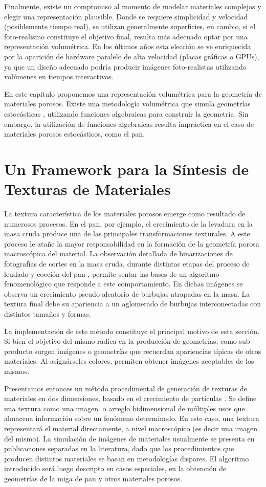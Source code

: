 Finalmente, existe un compromiso al momento de modelar materiales complejos y elegir una representación plausible.
Donde se requiere simplicidad y velocidad (posiblemente tiempo real), se utilizan generalmente superficies, en cambio, si el foto-realismo constituye el objetivo final, resulta más adecuado optar por una representación volumétrica.
En los últimos años esta elección se ve enriquecida por la aparición de hardware paralelo de alta velocidad (placas gráficas o GPUs), ya que un diseño adecuado podría producir imágenes foto-realistas utilizando volúmenes en tiempos interactivos.

En este capítulo proponemos una representación volumétrica para la geometría de materiales porosos.
Existe una metodología volumétrica que simula geometrías estocásticas \cite{Perlin1989}, utilizando funciones algebraicas para construir la geometría.
Sin embargo, la utilización de funciones algebraicas resulta impráctica en el caso de materiales porosos estocásticos, como el pan.

\section[Síntesis de Texturas de Materiales]{Un Framework para la Síntesis de Texturas de Materiales}

La textura característica de los materiales porosos emerge como resultado de numerosos procesos.
En el pan, por ejemplo, el crecimiento de la levadura en la masa cruda produce una de las principales transformaciones texturales.
A este proceso le atañe la mayor responsabilidad en la formación de la geometría porosa macroscópica del material.
La observación detallada de binarizaciones de fotografías de cortes en la masa cruda, durante distintas etapas del proceso de leudado y cocción del pan \cite{Scanlon2001}, permite sentar las bases de un algoritmo fenomenológico que responde a este comportamiento.
En dichas imágenes se observa un crecimiento pseudo-aleatorio de burbujas atrapadas en la masa.
La textura final debe su apariencia a un aglomerado de burbujas interconectadas con distintos tamaños y formas.

La implementación de este método constituye el principal motivo de esta sección.
Si bien el objetivo del mismo radica en la producción de geometrías, como sub-producto surgen imágenes o geometrías que recuerdan apariencias típicas de otros materiales.
Al asignárseles colores, permiten obtener imágenes aceptables de los mismos.

Presentamos entonces un método procedimental de generación de texturas de materiales en dos dimensiones, basado en el crecimiento de partículas \cite{Reeves1983}.
Se define una textura como una imagen. o arreglo bidimensional de múltiples usos que almacena información sobre un fenómeno determinado.
En este caso, una textura representará el material directamente, a nivel macroscópico (es decir una imagen del mismo).
La simulación de imágenes de materiales usualmente se presenta en publicaciones separadas en la literatura, dado que los procedimientos que producen distintos materiales se basan en metodologías dispares.
El algoritmo introducido será luego descripto en casos especiales, en la obtención de geometrías de la miga de pan y otros materiales porosos.

